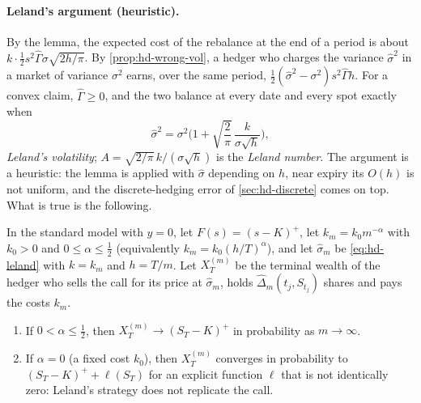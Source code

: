 \paragraph{Leland's argument (heuristic).} By the lemma, the expected cost of the rebalance
at the end of a period is about $k\cdot\frac12s^2\hat\Gamma\sigma\sqrt{2h/\pi}$. By
\cref{prop:hd-wrong-vol}, a hedger who charges the variance $\hat\sigma^2$ in a market of variance
$\sigma^2$ earns, over the same period, $\frac12(\hat\sigma^2-\sigma^2)s^2\hat\Gamma h$. For a convex claim,
$\hat\Gamma\ge0$, and the two balance at every date and every spot exactly when
\begin{equation}\label{eq:hd-leland}
  \hat\sigma^2=\sigma^2\Big(1+\sqrt{\frac2\pi}\,\frac{k}{\sigma\sqrt h}\Big),
\end{equation}
\emph{Leland's volatility}; $A=\sqrt{2/\pi}\,k/(\sigma\sqrt h)$ is the \emph{Leland number}. The argument is a
heuristic: the lemma is applied with $\hat\sigma$ depending on $h$, near expiry its $O(h)$ is not
uniform, and the discrete-hedging error of \cref{sec:hd-discrete} comes on top. What is true is
the following.

\begin{theorem}\label{thm:hd-leland}
In the standard model with $y=0$, let $F(s)=(s-K)^+$, let $k_m=k_0m^{-\alpha}$ with $k_0>0$ and
$0\le\alpha\le\frac12$ (equivalently $k_m=k_0(h/T)^\alpha$), and let $\hat\sigma_m$ be \eqref{eq:hd-leland} with $k=k_m$
and $h=T/m$. Let $X^{(m)}_T$ be the terminal wealth of the hedger who sells the call for its
price at $\hat\sigma_m$, holds $\hat\Delta_m(t_j,S_{t_j})$ shares and pays the costs $k_m$.
\begin{enumerate}[label=(\roman*)]
  \item If $0<\alpha\le\frac12$, then $X^{(m)}_T\to(S_T-K)^+$ in probability as $m\to\infty$.
  \item If $\alpha=0$ (a fixed cost $k_0$), then $X^{(m)}_T$ converges in probability to
    $(S_T-K)^++\ell(S_T)$ for an explicit function $\ell$ that is not identically zero: Leland's
    strategy does not replicate the call.
\end{enumerate}
\end{theorem}

